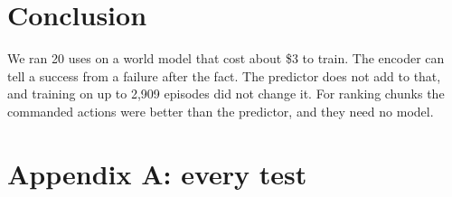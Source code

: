 \documentclass[10pt,twocolumn]{article}
\begin{document}
\section{Conclusion}


\begin{shissofinding}[Conclusion.]
We ran 20 uses on a world model that cost about \$3 to train. The encoder can tell a success from a failure after the fact. The predictor does not add to that, and training on up to 2,909 episodes did not change it. For ranking chunks the commanded actions were better than the predictor, and they need no model.
\end{shissofinding}


\section{Appendix A: every test}
\end{document}
